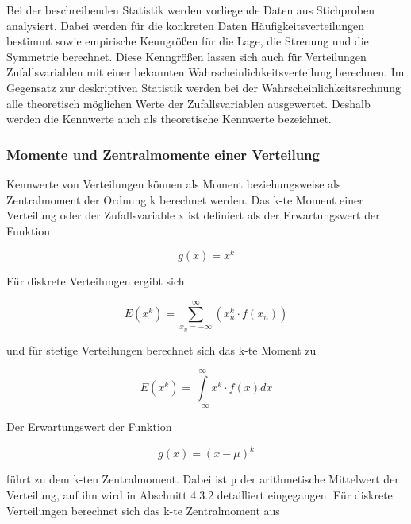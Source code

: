 \noindent Bei der beschreibenden Statistik werden vorliegende Daten aus Stichproben analysiert. Dabei werden f\"{u}r die konkreten Daten H\"{a}ufigkeitsverteilungen bestimmt sowie empirische Kenngr\"{o}{\ss}en f\"{u}r die Lage, die Streuung und die Symmetrie berechnet. Diese Kenngr\"{o}{\ss}en lassen sich auch f\"{u}r Verteilungen Zufallsvariablen mit einer bekannten Wahrscheinlichkeitsverteilung berechnen. Im Gegensatz zur deskriptiven Statistik werden bei der Wahrscheinlichkeitsrechnung alle theoretisch m\"{o}glichen Werte der Zufallsvariablen ausgewertet. Deshalb werden die Kennwerte auch als theoretische Kennwerte bezeichnet.

\subsubsection{Momente und Zentralmomente einer Verteilung}

\noindent Kennwerte von Verteilungen k\"{o}nnen als Moment beziehungsweise als Zentralmoment der Ordnung k berechnet werden. Das k-te Moment einer Verteilung oder der Zufallsvariable x ist definiert als der Erwartungswert der Funktion 

\begin{equation}\label{eq:fourthirtyfive}
g(x)=x^{k}
\end{equation}

\noindent F\"{u}r diskrete Verteilungen ergibt sich 

\begin{equation}\label{eq:fourthirtysix}
E(x^{k})=\sum _{x_{n} =-\infty }^{\infty }\left(x_{n}^{k} \cdot f(x_{n})\right)
\end{equation}

\noindent und f\"{u}r stetige Verteilungen berechnet sich das k-te Moment zu

\begin{equation}\label{eq:fourthirtyseven}
E(x^{k})=\int\limits _{-\infty }^{\infty }x^{k} \cdot f(x) dx
\end{equation}

\noindent Der Erwartungswert der Funktion 

\begin{equation}\label{eq:fourthirtyeight}
g(x)=(x-\mu)^{k}
\end{equation}

\noindent f\"{u}hrt zu dem k-ten Zentralmoment. Dabei ist µ der arithmetische Mittelwert der Verteilung, auf ihn wird in Abschnitt 4.3.2 detailliert eingegangen. F\"{u}r diskrete Verteilungen berechnet sich das k-te Zentralmoment aus 

